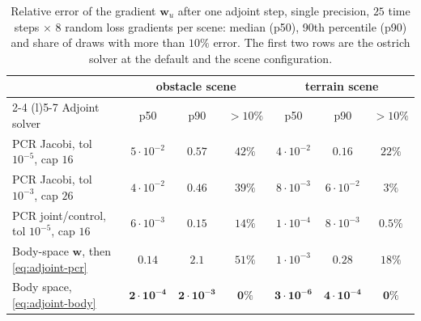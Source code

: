 \begin{table}[h]
  \centering
  \small
  \begin{tabular}{@{}lcccccc@{}}
    \toprule
    & \multicolumn{3}{c}{obstacle scene} & \multicolumn{3}{c}{terrain scene} \\
    \cmidrule(lr){2-4} \cmidrule(l){5-7}
    Adjoint solver & p50 & p90 & $>10\%$ & p50 & p90 & $>10\%$ \\
    \midrule
    PCR Jacobi, tol $10^{-5}$, cap $16$ & $5 \cdot 10^{-2}$ & $0.57$ & $42\%$ & $4 \cdot 10^{-2}$ & $0.16$ & $22\%$ \\
    PCR Jacobi, tol $10^{-3}$, cap $26$ & $4 \cdot 10^{-2}$ & $0.46$ & $39\%$ & $8 \cdot 10^{-3}$ & $6 \cdot 10^{-2}$ & $3\%$ \\
    PCR joint/control, tol $10^{-5}$, cap $16$ & $6 \cdot 10^{-3}$ & $0.15$ & $14\%$ & $1 \cdot 10^{-4}$ & $8 \cdot 10^{-3}$ & $0.5\%$ \\
    Body-space $\mathbf{w}$, then \eqref{eq:adjoint-pcr} & $0.14$ & $2.1$ & $51\%$ & $1 \cdot 10^{-3}$ & $0.28$ & $18\%$ \\
    Body space, \eqref{eq:adjoint-body} & $\mathbf{2 \cdot 10^{-4}}$ & $\mathbf{2 \cdot 10^{-3}}$ & $\mathbf{0\%}$ & $\mathbf{3 \cdot 10^{-6}}$ & $\mathbf{4 \cdot 10^{-4}}$ & $\mathbf{0\%}$ \\
    \bottomrule
  \end{tabular}
  \caption{Relative error of the gradient $\mathbf{w}_u$ after one adjoint
    step, single precision, $25$ time steps $\times$ $8$ random loss
    gradients per scene: median (p50), 90th percentile (p90) and share of
    draws with more than $10\%$ error. The first two rows are the ostrich
    solver at the default and the scene configuration.}
  \label{tab:adjoint-accuracy}
\end{table}

